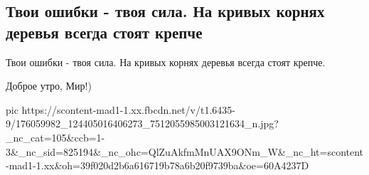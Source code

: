  
 
 
 
 

\subsection{Твои ошибки - твоя сила. На кривых корнях деревья всегда стоят крепче}
\label{sec:20_04_2021.fb.respublikalnr.2.korni_sila}

Твои ошибки - твоя сила. На кривых корнях деревья всегда стоят крепче.

Доброе утро, Мир!)


\ifcmt
  pic https://scontent-mad1-1.xx.fbcdn.net/v/t1.6435-9/176059982_124405016406273_7512055985003121634_n.jpg?_nc_cat=105&ccb=1-3&_nc_sid=825194&_nc_ohc=QlZuAkfmMnUAX9ONm_W&_nc_ht=scontent-mad1-1.xx&oh=39f020d2b6a616719b78a6b20f9739ba&oe=60A4237D
\fi

